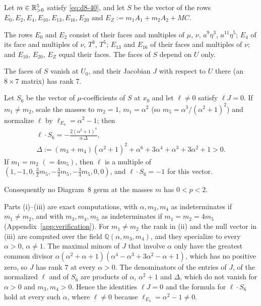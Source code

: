 \begin{lemma}\label{lem:d8-order-six}
Let $m\in\mathbb{R}_{>0}^5$ satisfy \eqref{eq:d8-40}, and let $S$ be the vector of the rows
$E_0,E_2,E_4,E_{10},E_{13},E_{16},E_{20}$ and $E_Z:=m_1A_1+m_2A_2+MC$.
\begin{romanlist}
\item The rows $E_0$ and $E_2$ consist of their faces and multiples of $\mu$, $\nu$,
$a^9\eta^3$, $a^{11}\eta^5$; $E_4$ of its face and multiples of $\nu$, $T^3$, $T^5$; $E_{13}$ and
$E_{16}$ of their faces and multiples of $\nu$; and $E_{10}$, $E_{20}$, $E_Z$ equal their faces.
The faces of $S$ depend on $U$ only.
\item The faces of $S$ vanish at $U_0$, and their Jacobian $J$ with respect to $U$ there (an
$8\times7$ matrix) has rank $7$.
\item Let $S_6$ be the vector of $\mu$-coefficients of $S$ at $x_0$ and let $\ell\ne0$ satisfy
$\ell J=0$.  If $m_1\ne m_2$, scale the masses to $m_2=1$, $m_1=\alpha^2$ (so
$m_5=\alpha^3/(\alpha^2+1)^2$) and normalize $\ell$ by $\ell_{E_4}=\alpha^2-1$; then
\begin{gather*}
  \ell\cdot S_6=-\frac{2(\alpha^2+1)^4}{\alpha\,\Delta},\\
  \Delta:=(m_3+m_4)(\alpha^2+1)^2+\alpha^6+3\alpha^4+\alpha^3+3\alpha^2+1>0.
\end{gather*}
If $m_1=m_2$ $(=4m_5)$, then $\ell$ is a multiple of
$(1,-1,0,\frac32m_5,-\frac34m_5,-\frac34m_5,0,0)$, and $\ell\cdot S_6=-1$ for this vector.
\end{romanlist}
Consequently no Diagram~8 germ at the masses $m$ has $0<p<2$.
\end{lemma}
Parts (i)--(iii) are exact computations, with $\alpha,m_3,m_4$ as indeterminates if
$m_1\ne m_2$, and with $m_3,m_4,m_5$ as indeterminates if $m_1=m_2=4m_5$
(Appendix~\ref{app:verification}).  For $m_1\ne m_2$ the rank in (ii) and the null vector in
(iii) are computed over the field $\mathbb Q(\alpha,m_3,m_4)$, and they specialize to every
$\alpha>0$, $\alpha\ne1$.  The maximal minors of $J$ that involve $\alpha$ only have the greatest
common divisor $\alpha(\alpha^2+\alpha+1)(\alpha^4-\alpha^3+3\alpha^2-\alpha+1)$, which has no
positive zero, so $J$ has rank $7$ at every $\alpha>0$.  The denominators of the entries of $J$,
of the normalized $\ell$ and of $S_6$ are products of $\alpha$, $\alpha^2+1$ and $\Delta$, which
do not vanish for $\alpha>0$ and $m_3,m_4>0$.  Hence the identities $\ell J=0$ and the formula
for $\ell\cdot S_6$ hold at every such $\alpha$, where $\ell\ne0$ because
$\ell_{E_4}=\alpha^2-1\ne0$.

